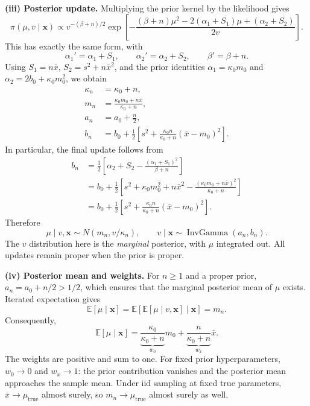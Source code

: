 \documentclass[11pt,a4paper]{article}
\newcommand{\given}{\mathrel{|}}
\newcommand{\xvec}{\boldsymbol{x}}
\DeclareMathOperator{\InvGamma}{InvGamma}
\newcommand{\E}{\mathbb{E}}
\begin{document}
\textbf{(iii) Posterior update.}
Multiplying the prior kernel by the likelihood gives
\[
\pi(\mu,v\given\xvec)
\propto v^{-(\beta+n)/2}
\exp\left[-\frac{(\beta+n)\mu^2
 -2(\alpha_1+S_1)\mu+(\alpha_2+S_2)}{2v}\right].
\]
This has exactly the same form, with
\[
\boxed{\alpha_1'=\alpha_1+S_1,\qquad
\alpha_2'=\alpha_2+S_2,\qquad\beta'=\beta+n.}
\]
Using $S_1=n\bar x$, $S_2=s^2+n\bar x^2$, and the prior identities
$\alpha_1=\kappa_0m_0$ and $\alpha_2=2b_0+\kappa_0m_0^2$, we obtain
\[
\boxed{\begin{aligned}
\kappa_n&=\kappa_0+n,\\
m_n&=\frac{\kappa_0m_0+n\bar x}{\kappa_0+n},\\
a_n&=a_0+\frac n2,\\
b_n&=b_0+\frac12\left[s^2+
 \frac{\kappa_0n}{\kappa_0+n}(\bar x-m_0)^2\right].
\end{aligned}}
\]
In particular, the final update follows from
\[
\begin{aligned}
b_n
&=\frac12\left[\alpha_2+S_2-
 \frac{(\alpha_1+S_1)^2}{\beta+n}\right]\\
&=b_0+\frac12\left[s^2+\kappa_0m_0^2+n\bar x^2
 -\frac{(\kappa_0m_0+n\bar x)^2}{\kappa_0+n}\right]\\
&=b_0+\frac12\left[s^2+
 \frac{\kappa_0n}{\kappa_0+n}(\bar x-m_0)^2\right].
\end{aligned}
\]
Therefore
\[
\boxed{\mu\given v,\xvec\sim N(m_n,v/\kappa_n),\qquad
v\given\xvec\sim\InvGamma(a_n,b_n).}
\]
The $v$ distribution here is the \emph{marginal} posterior, with $\mu$
integrated out. All updates remain proper when the prior is proper.

\textbf{(iv) Posterior mean and weights.}
For $n\ge1$ and a proper prior, $a_n=a_0+n/2>1/2$, which ensures that
the marginal posterior mean of $\mu$ exists. Iterated expectation gives
\[
\E[\mu\given\xvec]
=\E\!\left[\E[\mu\given v,\xvec]\given\xvec\right]
=m_n.
\]
Consequently,
\[
\boxed{\E[\mu\given\xvec]
=\underbrace{\frac{\kappa_0}{\kappa_0+n}}_{w_0}m_0
 +\underbrace{\frac n{\kappa_0+n}}_{w_x}\bar x.}
\]
The weights are positive and sum to one. For fixed prior hyperparameters,
$w_0\to0$ and $w_x\to1$: the prior contribution vanishes and the
posterior mean approaches the sample mean. Under iid sampling at fixed
true parameters, $\bar x\to\mu_{\mathrm{true}}$ almost surely, so
$m_n\to\mu_{\mathrm{true}}$ almost surely as well.
\end{document}
